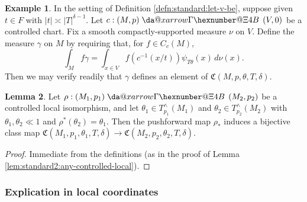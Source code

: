 \documentclass[reqno]{amsart}
\makeatletter
\newcommand*{\da@rightarrow}{\mathchar"0\hexnumber@\symAMSa 4B }
\newcommand*{\xdashrightarrow}[2][]{%
  \mathrel{%
    \mathpalette{\da@xarrow{#1}{#2}{}\da@rightarrow{\,}{}}{}%
  }%
}
\newcommand*{\da@xarrow}[7]{%
  \sbox0{$\ifx#7\scriptstyle\scriptscriptstyle\else\scriptstyle\fi#5#1#6\m@th$}%
  \sbox2{$\ifx#7\scriptstyle\scriptscriptstyle\else\scriptstyle\fi#5#2#6\m@th$}%
  \sbox4{$#7\dabar@\m@th$}%
  \dimen@=\wd0 %
  \ifdim\wd2 >\dimen@
    \dimen@=\wd2 %
  \fi
  \count@=2 %
  \def\da@bars{\dabar@\dabar@}%
  \@whiledim\count@\wd4<\dimen@\do{%
    \advance\count@\@ne
    \expandafter\def\expandafter\da@bars\expandafter{%
      \da@bars
      \dabar@ 
    }%
  }%
  \mathrel{#3}%
  \mathrel{%
    \mathop{\da@bars}\limits
    \ifx\\#1\\%
    \else
      _{\copy0}%
    \fi
    \ifx\\#2\\%
    \else
      ^{\copy2}%
    \fi
  }%
  \mathrel{#4}%
}
\theoremstyle{plain} \newtheorem{theorem} {Theorem}
\theoremstyle{definition} \newtheorem{definition} [theorem] {Definition}
\newtheorem{example} [theorem] {Example}
\theoremstyle{itplain} %
\newtheorem{lemma}[theorem]{Lemma}
\numberwithin{equation}{section}
\numberwithin{theorem}{section}
\makeatother
\begin{document}
\begin{example}\label{example:standard2:smooth-modulated-bump-in-frak-C}
  In the setting of Definition \ref{defn:standard:let-v-be}, suppose given $t \in F$ with $|t| \asymp |T|^{\delta-1}$.  Let $c : (M, p ) \xdashrightarrow{} (V,0)$ be a controlled chart.  Fix a smooth compactly-supported measure $\nu$ on $V$.  Define the measure $\gamma$ on $M$ by requiring that, for $f \in C_c(M)$,
  \begin{equation*}
    \int_M f \gamma
    = \int _{x \in V}
    f(c^{-1}(x/t))
    \psi_{T \theta}(x)
    \, d \nu(x).
  \end{equation*}
  Then we may verify readily that $\gamma$ defines an element of $\mathfrak{C}(M,p,\theta,T,\delta)$.
\end{example}

\begin{lemma}\label{lem:if-rho-local}
  Let $\rho : (M_1, p_1) \xdashrightarrow{} (M_2,p_2)$ be a controlled local isomorphism, and let $\theta_1 \in T_{p_1}^\wedge(M_1)$ and $\theta_2 \in T_{p_2}^\wedge(M_2)$ with $\theta_1, \theta_2 \ll 1$ and $\rho^*(\theta_2) = \theta_1$.  Then the pushforward map $\rho_*$ induces a bijective class map $\mathfrak{C}(M_1,p_1,\theta_1,T,\delta) \rightarrow \mathfrak{C}(M_2,p_2,\theta_2,T,\delta)$.
\end{lemma}
\begin{proof}
  Immediate from the definitions (as in the proof of Lemma \ref{lem:standard2:any-controlled-local}).
\end{proof}

\subsubsection{Explication in local coordinates}
\end{document}
